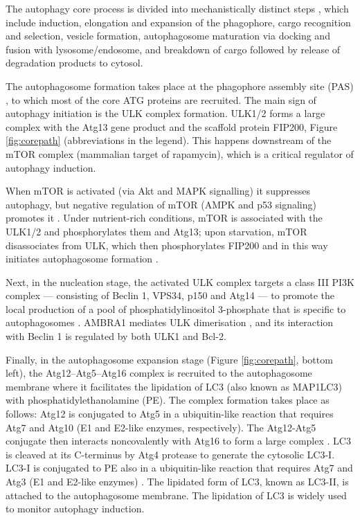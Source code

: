     The autophagy core process is divided into mechanistically distinct steps \cite{He2009}, which include induction, elongation and expansion of the phagophore, cargo recognition and selection, vesicle formation, autophagosome maturation via docking and fusion with lysosome/endosome, and breakdown of cargo followed by release of degradation products to cytosol.
    
    The autophagosome formation takes place at the phagophore assembly site (PAS) \cite{kim2002con}, to which most of the core ATG proteins are recruited. The main sign of autophagy initiation is the ULK complex formation. ULK1/2 forms a large complex with the Atg13 gene product and the scaffold protein FIP200, Figure \ref{fig:corepath} (abbreviations in the legend). This happens downstream of the mTOR complex (mammalian target of rapamycin), which is a critical regulator of autophagy induction. 
    
    When mTOR is activated (via Akt and MAPK signalling) it suppresses autophagy, but negative regulation of mTOR (AMPK and p53 signaling) promotes it \cite{Yang2010}. Under nutrient-rich conditions, mTOR is associated with the ULK1/2  and phosphorylates them and Atg13; upon starvation, mTOR disassociates from ULK, which then phosphorylates FIP200 and in this way initiates autophagosome formation \cite{lamb2013}. 
    
        Next, in the nucleation stage, the activated ULK complex targets a class III PI3K complex — consisting of Beclin 1,  VPS34, p150 and Atg14 — to promote the local production of a pool of phosphatidylinositol 3-phosphate that is specific to autophagosomes \cite{Kaur2015}. AMBRA1 mediates ULK dimerisation \cite{Nazio2013MTORTRAF6}, and its interaction with Beclin 1 is regulated by both ULK1 and Bcl-2.        
        

    
    Finally, in the autophagosome expansion stage (Figure \ref{fig:corepath}, bottom left), the Atg12–Atg5–Atg16 complex is recruited to the autophagosome membrane where it facilitates the lipidation of LC3 (also known as MAP1LC3) with phosphatidylethanolamine (PE). The complex formation takes place as follows:  Atg12 is conjugated to Atg5 in a ubiquitin-like reaction that requires Atg7 and Atg10 (E1 and E2-like enzymes, respectively). The Atg12-Atg5 conjugate then interacts noncovalently with Atg16 to form a large complex \cite{He2009}. LC3 is cleaved at its C-terminus by Atg4 protease to generate the cytosolic LC3-I. LC3-I is conjugated to PE also in a ubiquitin-like reaction that requires Atg7 and Atg3 (E1 and E2-like enzymes) \cite{He2009}. The lipidated form of LC3, known as LC3-II, is attached to the autophagosome membrane. The lipidation of LC3 is widely used to monitor autophagy induction. \\
 
